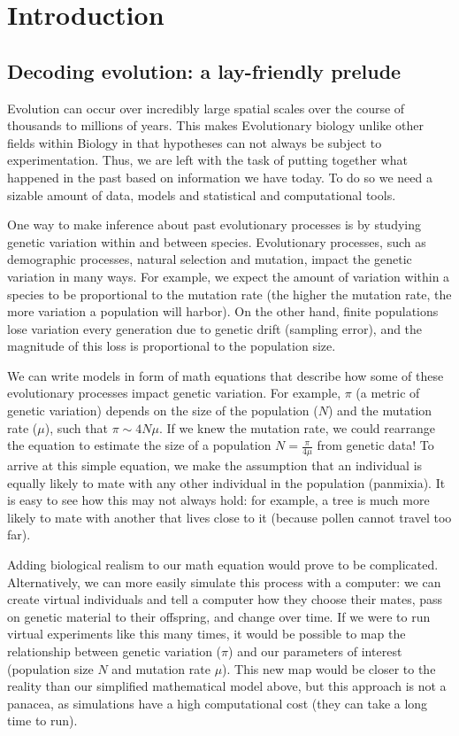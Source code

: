 \chapter{Introduction}

\section{Decoding evolution: a lay-friendly prelude}
Evolution can occur over incredibly large spatial scales over the course of thousands to millions of years.
This makes Evolutionary biology unlike other fields within Biology in that hypotheses can not always be subject to experimentation.
Thus, we are left with the task of putting together what happened in the past based on information we have today.
To do so we need a sizable amount of data, models and statistical and computational tools.

One way to make inference about past evolutionary processes is by studying genetic variation within and between species.
Evolutionary processes, such as demographic processes, natural selection and mutation, impact the genetic variation in many ways.
For example, we expect the amount of variation within a species to be proportional to the mutation rate (\ie the higher the mutation rate, the more variation a population will harbor).
On the other hand, finite populations lose variation every generation due to genetic drift (\ie sampling error), 
and the magnitude of this loss is proportional to the population size.

We can write models in form of math equations that describe how some of these evolutionary processes impact genetic variation.
For example, $\pi$ (a metric of genetic variation) depends on the size of the population ($N$) and the mutation rate ($\mu$), such that $\pi \sim 4N\mu$.
If we knew the mutation rate, we could rearrange the equation to estimate the size of a population $N = \frac{\pi}{4\mu}$ from genetic data!
To arrive at this simple equation, we make the assumption that an individual is equally likely to mate with any other individual in the population (\ie panmixia).
It is easy to see how this may not always hold:
for example, a tree is much more likely to mate with another that lives close to it (because pollen cannot travel too far).

Adding biological realism to our math equation would prove to be complicated.
Alternatively, we can more easily simulate this process with a computer:
we can create virtual individuals and tell a computer how they choose their mates, pass on genetic material to their offspring, and change over time.
If we were to run virtual experiments like this many times,
it would be possible to map the relationship between genetic variation ($\pi$) and our parameters of interest (population size $N$ and mutation rate $\mu$).
This new map would be closer to the reality than our simplified mathematical model above,
but this approach is not a panacea, as simulations have a high computational cost (\ie they can take a long time to run).

